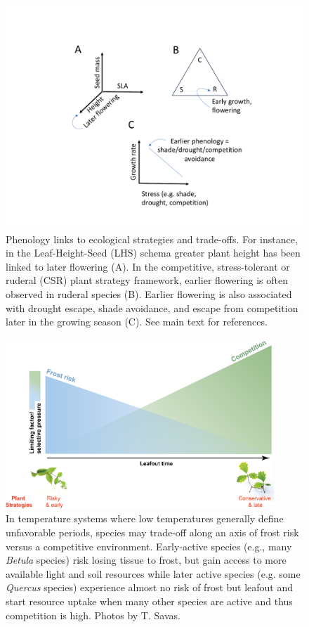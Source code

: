 \documentclass[11pt]{article}
\begin{document}
\begin{figure}[h!]
\centering
\includegraphics[width=1\textwidth]{..//figures/figsubmit/AREESfigure.pdf}
\caption{Phenology links to ecological strategies and trade-offs. For instance, in the Leaf-Height-Seed (LHS) schema greater plant height has been linked to later flowering (A). In the competitive, stress-tolerant or ruderal (CSR) plant strategy framework, earlier flowering is often observed in ruderal species (B). Earlier flowering is also associated with drought escape, shade avoidance, and escape from competition later in the growing season (C). See main text for references.}
 \label{fig:traitcorr}
\end{figure}


\begin{figure}[h!]
\centering
\includegraphics[width=0.9\textwidth]{..//figures/figsubmit/frosttradeoffs2.png}
\caption{In temperature systems where low temperatures generally define unfavorable periods, species may trade-off along an axis of frost risk versus a competitive environment. Early-active species (e.g., many \emph{Betula} species) risk losing tissue to frost, but gain access to more available light and soil resources while later active species  (e.g. some \emph{Quercus} species) experience almost no risk of frost but leafout and start resource uptake when many other species are active and thus competition is high. Photos by T. Savas.}
 \label{fig:seasonaltradeoffs}
\end{figure}
\end{document}
